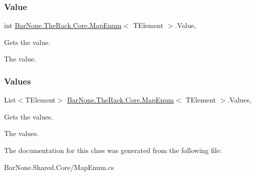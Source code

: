 \subsubsection{\texorpdfstring{Value}{Value}}
{\footnotesize\ttfamily int \mbox{\hyperlink{class_bar_none_1_1_the_rack_1_1_core_1_1_map_enum}{Bar\+None.\+The\+Rack.\+Core.\+Map\+Enum}}$<$ T\+Element $>$.Value\hspace{0.3cm}{\ttfamily [get]}, {}}



Gets the value. 

The value. \mbox{\label{class_bar_none_1_1_the_rack_1_1_core_1_1_map_enum_ad06502517c6ae2ad52142a67a2abde4d}} 
\subsubsection{\texorpdfstring{Values}{Values}}
{\footnotesize\ttfamily List$<$T\+Element$>$ \mbox{\hyperlink{class_bar_none_1_1_the_rack_1_1_core_1_1_map_enum}{Bar\+None.\+The\+Rack.\+Core.\+Map\+Enum}}$<$ T\+Element $>$.Values\hspace{0.3cm}{\ttfamily [static]}, {\ttfamily [get]}}



Gets the values. 

The values. 

The documentation for this class was generated from the following file\+:\begin{DoxyCompactItemize}
\item 
Bar\+None.\+Shared.\+Core/Map\+Enum.\+cs\end{DoxyCompactItemize}
